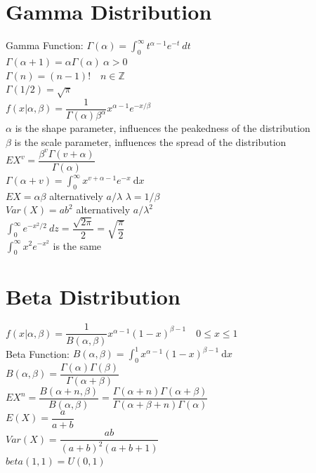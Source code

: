 \documentclass[openany]{book}
\newcommand{\dx}{\mathrm{d}x}
\begin{document}
\section{Gamma Distribution}
Gamma Function: $\Gamma(\alpha)=\int_{0}^{\infty}t^{\alpha-1}e^{-t} \ dt$\\
$\Gamma(\alpha+1)=\alpha \Gamma(\alpha) \ \alpha>0$\\
$\Gamma(n)=(n-1)! \quad n \in \mathbb{Z}$\\
$\Gamma(1/2)=\sqrt{\pi}$\\
$f(x|\alpha,\beta)=\dfrac{1}{\Gamma(\alpha) \beta^\alpha}x^{\alpha-1}e^{-x/\beta}$\\
$\alpha$ is the shape parameter, influences the peakedness of the distribution\\
$\beta$ is the scale parameter, influences the spread of the distribution\\
$EX^v=\dfrac{\beta^v \Gamma(v+\alpha)}{\Gamma(\alpha)}$\\
$\Gamma(\alpha+v)=\int_{0}^{\infty}x^{v+\alpha-1}e^{-x} \ \dx$\\
$EX=\alpha \beta$ alternatively $a/\lambda$ $\lambda=1/\beta$\\
$Var(X)=ab^2$ alternatively $a/\lambda^2$\\
$\int_{0}^{\infty}e^{-x^2/2} \ dz=\dfrac{\sqrt{2\pi}}{2}=\sqrt{\dfrac{\pi}{2}}$\\
$\int_{0}^{\infty}x^2e^{-x^2}$ is the same\\
\section{Beta Distribution}
$f(x|\alpha,\beta)=\dfrac{1}{B(\alpha,\beta)}x^{\alpha-1}(1-x)^{\beta-1} \quad 0\leq x\leq 1$\\
Beta Function: $B(\alpha,\beta)=\int_{0}^{1}x^{\alpha-1}(1-x)^{\beta-1} \ \dx$ \\ 
$B(\alpha,\beta)=\dfrac{\Gamma(\alpha)\Gamma(\beta)}{\Gamma(\alpha+\beta)}$\\
$EX^n=\dfrac{B(\alpha+n,\beta)}{B(\alpha,\beta)}=\dfrac{\Gamma(\alpha+n)\Gamma(\alpha+\beta)}{\Gamma(\alpha+\beta+n)\Gamma(\alpha)}$\\
$E(X)=\dfrac{a}{a+b}$\\
$Var(X)=\dfrac{ab}{(a+b)^2(a+b+1)}$\\
$beta(1,1)=U(0,1)$
\end{document}

